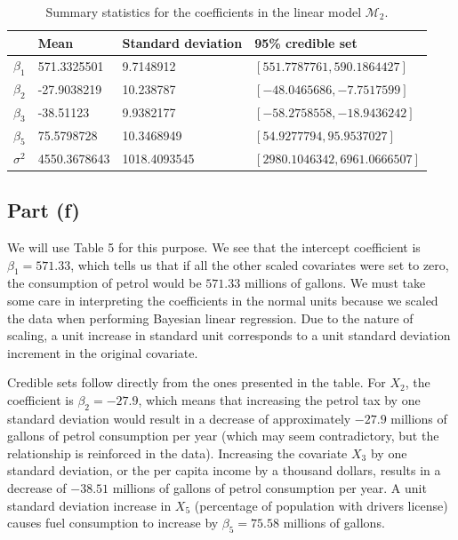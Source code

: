 \documentclass[
]{homework}
\begin{document}
\begin{table}[H]
  \centering
  \begin{tabular}{clll}
    \toprule
          & Mean & Standard deviation & 95\% credible set \\
    \midrule
    $\beta_1$      & 571.3325501 & 9.7148912 & $[551.7787761, 590.1864427]$ \\
    $\beta_2$      & -27.9038219 & 10.238787 & $[-48.0465686, -7.7517599]$ \\
    $\beta_3$      & -38.51123 & 9.9382177 & $[-58.2758558, -18.9436242]$ \\
    $\beta_5$      & 75.5798728 & 10.3468949 & $[54.9277794, 95.9537027]$ \\
    $\sigma^2$     & 4550.3678643 & 1018.4093545 & $[2980.1046342, 6961.0666507]$ \\
    \bottomrule
  \end{tabular}
  \label{tab:ex2-sum-stats-lin}
  \caption{Summary statistics for the coefficients in the linear model $\mathcal M_2$.}
\end{table}

\subsection{Part (f)}\label{part-f-1}

We will use Table 5 for this purpose. We see that the intercept coefficient is \(\beta_1 = 571.33\), which tells us that if all the other scaled covariates were set to zero, the consumption of petrol would be \(571.33\) millions of gallons. We must take some care in interpreting the coefficients in the normal units because we scaled the data when performing Bayesian linear regression. Due to the nature of scaling, a unit increase in standard unit corresponds to a unit standard deviation increment in the original covariate.

Credible sets follow directly from the ones presented in the table. For \(X_2\), the coefficient is \(\beta_2 = -27.9\), which means that increasing the petrol tax by one standard deviation would result in a decrease of approximately \(-27.9\) millions of gallons of petrol consumption per year (which may seem contradictory, but the relationship is reinforced in the data). Increasing the covariate \(X_3\) by one standard deviation, or the per capita income by a thousand dollars, results in a decrease of \(-38.51\) millions of gallons of petrol consumption per year. A unit standard deviation increase in \(X_5\) (percentage of population with drivers license) causes fuel consumption to increase by \(\beta_5 = 75.58\) millions of gallons.
\end{document}
